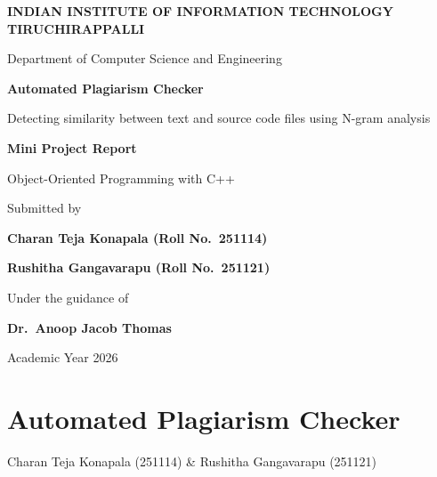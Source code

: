 \documentclass[11pt,a4paper]{report}
\begin{document}
\begin{titlepage}
  \centering
  \vspace*{0.5cm}
  {\Large\bfseries INDIAN INSTITUTE OF INFORMATION TECHNOLOGY\\[2pt] TIRUCHIRAPPALLI\par}
  \vspace{0.6cm}
  {\large Department of Computer Science and Engineering\par}
  \vspace{2.2cm}
  {\Huge\bfseries Automated Plagiarism Checker\par}
  \vspace{0.6cm}
  {\large Detecting similarity between text and source code files using N-gram analysis\par}
  \vspace{2.2cm}
  {\Large\bfseries Mini Project Report\par}
  \vspace{0.4cm}
  {\large Object-Oriented Programming with C++\par}
  \vspace{2.2cm}
  {\large Submitted by\par}
  \vspace{0.4cm}
  {\large\bfseries Charan Teja Konapala (Roll No.\ 251114)\par}
  {\large\bfseries Rushitha Gangavarapu (Roll No.\ 251121)\par}
  \vspace{1.6cm}
  {\large Under the guidance of\par}
  \vspace{0.3cm}
  {\large\bfseries Dr.\ Anoop Jacob Thomas\par}
  \vfill
  {\large Academic Year 2026\par}
\end{titlepage}

\tableofcontents
\clearpage
\listoffigures
\clearpage
\listoftables
\clearpage
{}

\chapter{Automated Plagiarism Checker}

\begin{center}
  {\large Charan Teja Konapala (251114) \& Rushitha Gangavarapu (251121)}
\end{center}
\end{document}

